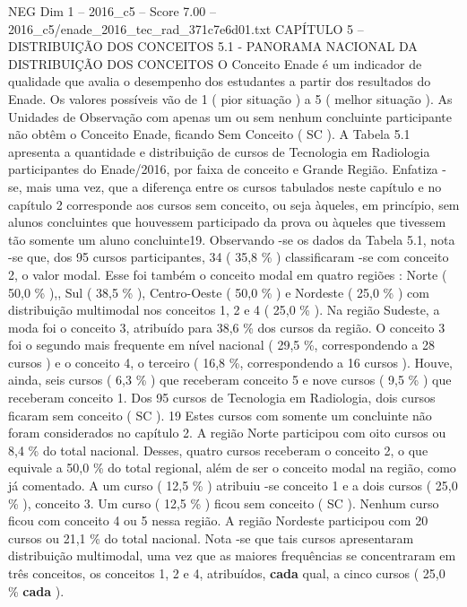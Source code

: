 \begin{textsample}{NEG Dim 1 – 2016\_c5 – Score 7.00 – 2016\_c5/enade\_2016\_tec\_rad\_371c7e6d01.txt}  \label{ex:f1_neg_363}
CAPÍTULO 5 – DISTRIBUIÇÃO DOS CONCEITOS 5.1 - PANORAMA NACIONAL DA DISTRIBUIÇÃO DOS CONCEITOS O Conceito Enade é um indicador de qualidade que avalia o desempenho dos estudantes a partir dos resultados do Enade.
Os valores possíveis vão de 1 ( pior situação ) a 5 ( melhor situação ).
As Unidades de Observação com apenas um ou sem nenhum concluinte participante não obtêm o Conceito Enade, ficando Sem Conceito ( SC ).
A Tabela 5.1 apresenta a quantidade e distribuição de cursos de Tecnologia em Radiologia participantes do Enade/2016, por faixa de conceito e Grande Região.
Enfatiza -se, mais uma vez, que a diferença entre os cursos tabulados neste capítulo e no capítulo 2 corresponde aos cursos sem conceito, ou seja àqueles, em princípio, sem alunos concluintes que houvessem participado da prova ou àqueles que tivessem tão somente um aluno concluinte19.
Observando -se os dados da Tabela 5.1, nota -se que, dos 95 cursos participantes, 34 ( 35,8 \% ) classificaram -se com conceito 2, o valor modal.
Esse foi também o conceito modal em quatro regiões : Norte ( 50,0 \% ),, Sul ( 38,5 \% ), Centro-Oeste ( 50,0 \% ) e Nordeste ( 25,0 \% ) com distribuição multimodal nos conceitos 1, 2 e 4 ( 25,0 \% ).
Na região Sudeste, a moda foi o conceito 3, atribuído para 38,6 \% dos cursos da região.
O conceito 3 foi o segundo mais frequente em nível nacional ( 29,5 \%, correspondendo a 28 cursos ) e o conceito 4, o terceiro ( 16,8 \%, correspondendo a 16 cursos ).
Houve, ainda, seis cursos ( 6,3 \% ) que receberam conceito 5 e nove cursos ( 9,5 \% ) que receberam conceito 1.
Dos 95 cursos de Tecnologia em Radiologia, dois cursos ficaram sem conceito ( SC ). 19 Estes cursos com somente um concluinte não foram considerados no capítulo 2.
A região Norte participou com oito cursos ou 8,4 \% do total nacional.
Desses, quatro cursos receberam o conceito 2, o que equivale a 50,0 \% do total regional, além de ser o conceito modal na região, como já comentado.
A um curso ( 12,5 \% ) atribuiu -se conceito 1 e a dois cursos ( 25,0 \% ), conceito 3.
Um curso ( 12,5 \% ) ficou sem conceito ( SC ).
Nenhum curso ficou com conceito 4 ou 5 nessa região.
A região Nordeste participou com 20 cursos ou 21,1 \% do total nacional.
Nota -se que tais cursos apresentaram distribuição multimodal, uma vez que as maiores frequências se concentraram em três conceitos, os conceitos 1, 2 e 4, atribuídos, \textbf{cada} qual, a cinco cursos ( 25,0 \% \textbf{cada} ).

\end{textsample}

